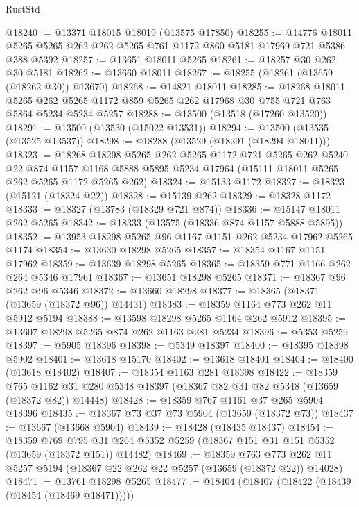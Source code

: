\begin{lexlean}{RustStd}
\begin{coremodule}
@18240 := @13371 @18015 @18019 (@13575 @17850)
@18255 := @14776
    @18011
    @5265
    @5265
    @262
    @262
    @5265
    @761
    @1172
    @860
    @5181
    @17969
    @721
    @5386
    @388
    @5392
@18257 := @13651 @18011 @5265
@18261 := @18257 @30 @262 @30 @5181
@18262 := @13660 @18011
@18267 := @18255 (@18261 (@13659 (@18262 @30)) @13670)
@18268 := @14821 @18011
@18285 := @18268
    @18011
    @5265
    @262
    @5265
    @1172
    @859
    @5265
    @262
    @17968
    @30
    @755
    @721
    @763
    @5864
    @5234
    @5234
    @5257
@18288 := @13500 (@13518 (@17260 @13520))
@18291 := @13500 (@13530 (@15022 @13531))
@18294 := @13500 (@13535 (@13525 @13537))
@18298 := @18288 (@13529 (@18291 (@18294 @18011)))
@18323 := @18268
    @18298
    @5265
    @262
    @5265
    @1172
    @721
    @5265
    @262
    @5240
    @22
    @874
    @1157
    @1168
    @5888
    @5895
    @5234
    @17964
    (@15111 @18011 @5265 @262 @5265 @1172 @5265 @262)
@18324 := @15133 @1172
@18327 := @18323 (@15121 (@18324 @22))
@18328 := @15139 @262
@18329 := @18328 @1172
@18333 := @18327 (@13783 (@18329 @721 @874))
@18336 := @15147 @18011 @262 @5265
@18342 := @18333 (@13575 (@18336 @874 @1157 @5888 @5895))
@18352 := @13953 @18298 @5265 @96 @1167 @1151 @262 @5234 @17962 @5265 @1174
@18354 := @13630 @18298 @5265
@18357 := @18354 @1167 @1151 @17962
@18359 := @13639 @18298 @5265
@18365 := @18359 @771 @1166 @262 @264 @5346 @17961
@18367 := @13651 @18298 @5265
@18371 := @18367 @96 @262 @96 @5346
@18372 := @13660 @18298
@18377 := @18365 (@18371 (@13659 (@18372 @96)) @14431)
@18383 := @18359 @1164 @773 @262 @11 @5912 @5194
@18388 := @13598 @18298 @5265 @1164 @262 @5912
@18395 := @13607 @18298 @5265 @874 @262 @1163 @281 @5234
@18396 := @5353 @5259
@18397 := @5905 @18396
@18398 := @5349 @18397
@18400 := @18395 @18398 @5902
@18401 := @13618 @15170
@18402 := @13618 @18401
@18404 := @18400 (@13618 @18402)
@18407 := @18354 @1163 @281 @18398
@18422 := @18359
    @765
    @1162
    @31
    @280
    @5348
    @18397
    (@18367 @82 @31 @82 @5348 (@13659 (@18372 @82)) @14448)
@18428 := @18359 @767 @1161 @37 @265 @5904 @18396
@18435 := @18367 @73 @37 @73 @5904 (@13659 (@18372 @73))
@18437 := @13667 (@13668 @5904)
@18439 := @18428 (@18435 @18437)
@18454 := @18359
    @769
    @795
    @31
    @264
    @5352
    @5259
    (@18367 @151 @31 @151 @5352 (@13659 (@18372 @151)) @14482)
@18469 := @18359
    @763
    @773
    @262
    @11
    @5257
    @5194
    (@18367 @22 @262 @22 @5257 (@13659 (@18372 @22)) @14028)
@18471 := @13761 @18298 @5265
@18477 := @18404 (@18407 (@18422 (@18439 (@18454 (@18469 @18471)))))

\end{coremodule}
\end{lexlean}
